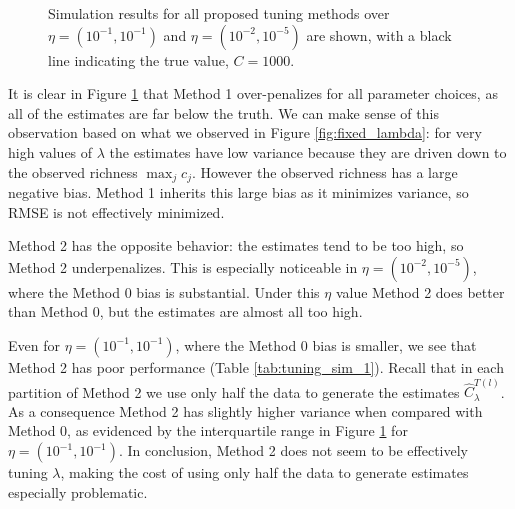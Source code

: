 \documentclass[oupdraft]{bio}
\begin{document}
\begin{figure}[t]
\caption{Simulation results for all proposed tuning methods over $\eta = (10^{-1}, 10^{-1})$ and $\eta = (10^{-2}, 10^{-5})$ are shown, with a black line indicating the true value, $C = 1000$.
\label{fig:tuning_sim_1}}  
\centering{}
\end{figure}

It is clear in Figure \ref{fig:tuning_sim_1} that Method 1 over-penalizes for all parameter choices, as all of the estimates are far below the truth.  We can make sense of this observation based on what we observed in Figure \ref{fig:fixed_lambda}: for very high values of $\lambda$ the estimates have low variance because they are driven down to the observed richness $\max_j c_j$.  However the observed richness has a large negative bias.  Method 1 inherits this large bias as it minimizes variance, so RMSE is not effectively minimized.

Method 2 has the opposite behavior: the estimates tend to be too high, so Method 2 underpenalizes.  This is especially noticeable in $\eta = (10^{-2}, 10^{-5})$, where the Method 0 bias is substantial.  Under this $\eta$ value Method 2 does better than Method 0, but the estimates are almost all too high.

Even for $\eta = (10^{-1}, 10^{-1})$, where the Method 0 bias is smaller, we see that Method 2 has poor performance (Table \ref{tab:tuning_sim_1}).  Recall that in each partition of Method 2 we use only half the data to generate the estimates $\widehat{C}^{T(l)}_{\lambda}$.  As a consequence Method 2 has slightly higher variance when compared with Method 0, as evidenced by the interquartile range in Figure \ref{fig:tuning_sim_1} for $\eta = (10^{-1}, 10^{-1})$.  In conclusion, Method 2 does not seem to be effectively tuning $\lambda$, making the cost of using only half the data to generate estimates especially problematic.
\end{document}
